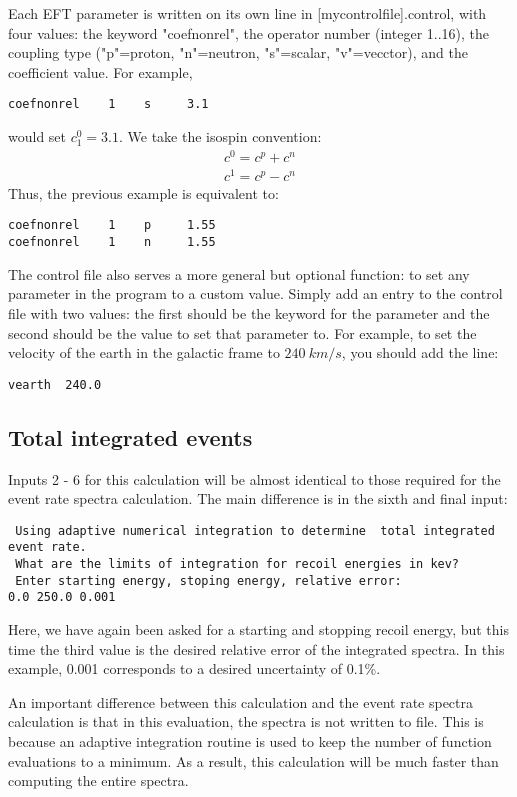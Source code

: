 \documentclass[11pt]{amsart}
\begin{document}
Each EFT parameter is written on its own line in [mycontrolfile].control, with
four values: the keyword "coefnonrel", the operator number (integer 1..16), the
coupling type ("p"=proton, "n"=neutron, "s"=scalar, "v"=vecctor), and the
coefficient value. For example, 
\begin{verbatim}
coefnonrel    1    s     3.1
\end{verbatim}
would set $c_1^0 = 3.1$. We take the isospin convention:
\begin{equation}
	\begin{split}
		c^0 = c^p + c^n\\
		c^1 = c^p - c^n
	\end{split}
\end{equation}
Thus, the previous example is equivalent to:
\begin{verbatim}
coefnonrel    1    p     1.55
coefnonrel    1    n     1.55
\end{verbatim}

The control file also serves a more general but optional function: to set any 
parameter in the program to a custom value.  
Simply add an entry to the control file with two values: the first 
should be the keyword for the parameter and the 
second should be the value to set that parameter to. For example, to set the 
velocity of the earth in the galactic frame to $240\ km/s$, you should add the line:
\begin{verbatim}
vearth  240.0
\end{verbatim}

\subsection{Total integrated events}
Inputs 2 - 6 for this calculation will be almost identical to those required for
the event rate spectra calculation. The main difference is in the sixth and
final input:
\begin{verbatim}
 Using adaptive numerical integration to determine  total integrated event rate.
 What are the limits of integration for recoil energies in kev?
 Enter starting energy, stoping energy, relative error:
0.0 250.0 0.001
\end{verbatim}
Here, we have again been asked for a starting and stopping recoil energy, but
this time the third value is the desired relative error of the integrated
spectra. In this example, 0.001 corresponds to a desired uncertainty of 0.1\%. 

An important difference between this calculation and the event rate spectra
calculation is that in this evaluation, the spectra is not written to file. This
is because an adaptive integration routine is used to keep the number of
function evaluations to a minimum. As a result, this calculation will be much
faster than computing the entire spectra.
\end{document}
